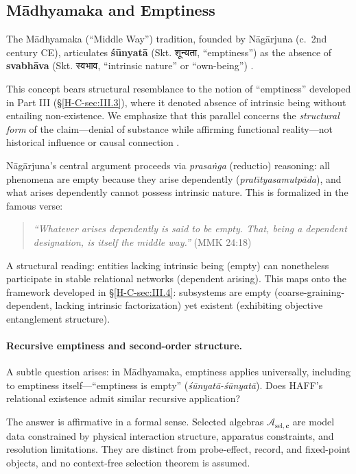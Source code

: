 \documentclass[12pt,a4paper,openany]{book}
\begin{document}
\subsection{M\=adhyamaka and Emptiness}
\label{H-C-sec:IV.3}

The M\=adhyamaka (``Middle Way'') tradition, founded by N\=ag\=arjuna (c.\ 2nd century CE), articulates \textbf{śūnyat\=a} (Skt. शून्यता, ``emptiness'') as the absence of \textbf{svabh\=ava} (Skt. स्वभाव, ``intrinsic nature'' or ``own-being'') \cite{Nagarjuna_MMK_Garfield1995}. 

This concept bears structural resemblance to the notion of ``emptiness'' developed in Part III (§\ref{H-C-sec:III.3}), where it denoted absence of intrinsic being without entailing non-existence. We emphasize that this parallel concerns the \emph{structural form} of the claim—denial of substance while affirming functional reality—not historical influence or causal connection \cite{Garfield2002,Siderits2007}.

N\=ag\=arjuna's central argument proceeds via \emph{prasaṅga} (reductio) reasoning: all phenomena are empty because they arise dependently (\emph{prat\={\i}tyasamutp\=ada}), and what arises dependently cannot possess intrinsic nature. This is formalized in the famous verse:
\begin{quote}
\emph{``Whatever arises dependently is said to be empty. That, being a dependent designation, is itself the middle way.''} (MMK 24:18) \cite{Nagarjuna_MMK_Garfield1995}
\end{quote}

A structural reading: entities lacking intrinsic being (empty) can nonetheless participate in stable relational networks (dependent arising). This maps onto the framework developed in §\ref{H-C-sec:III.4}: subsystems are empty (coarse-graining-dependent, lacking intrinsic factorization) yet existent (exhibiting objective entanglement structure).

\paragraph{Recursive emptiness and second-order structure.}
A subtle question arises: in M\=adhyamaka, emptiness applies universally, including to emptiness itself—``emptiness is empty'' (\emph{śūnyat\=a-śūnyat\=a}). Does HAFF's relational existence admit similar recursive application?

The answer is affirmative in a formal sense. Selected algebras $\mathcal{A}_{\mathrm{sel},\mathbf c}$ are model data constrained by physical interaction structure, apparatus constraints, and resolution limitations.  They are distinct from probe-effect, record, and fixed-point objects, and no context-free selection theorem is assumed.
\end{document}
